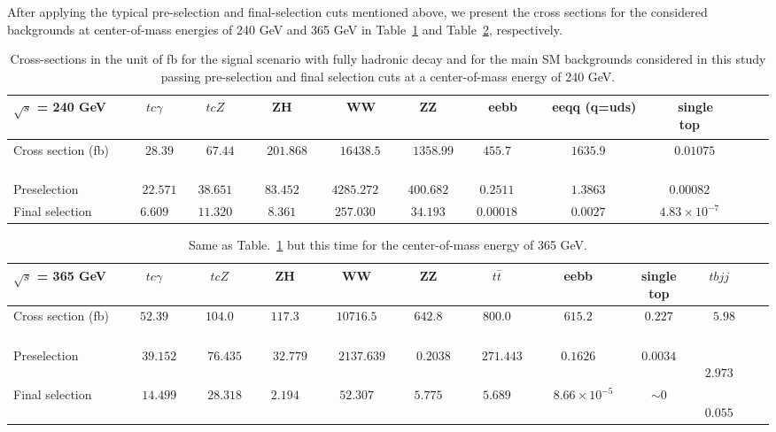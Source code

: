 \documentclass[11pt,onecolumn,english,showpacs,preprintnumbers,amsmath,amssymb,floatfix,nofootinbib]{revtex4-1}
\begin{document}
After applying the typical pre-selection and final-selection cuts mentioned above, we present the cross sections for the considered backgrounds at center-of-mass energies of 240 GeV and 365 GeV in Table~\ref{bkg-240-full-hadronic} and Table~\ref{bkg-365-full-hadronic}, respectively.
\begin{table}[htbp]
\begin{center}
\begin{tabular}{l|c c c c c c  c c c c c  }  \hline
$\sqrt {s}$ = 240 GeV   ~&~ $tc\gamma$  ~&~ $tcZ$   ~&  ~  ZH     ~&  ~ WW  &  ~  ZZ ~ &~ eebb ~&~ eeqq (q=uds) ~&~ single top  \\  \hline
Cross section (fb)    ~&~  $28.39$  ~&~ $67.44$  ~&~    $201.868$        ~&~  $16438.5$   ~&~    $1358.99$  ~&~  $455.7$ ~&~  $1635.9$  ~&~  $0.01075$       \\ 
Preselection    ~&~  $22.571$  & $38.651$  &    $83.452$        &  $4285.272$   &    $400.682$  &  $0.2511$ &  $1.3863$  &  $0.00082$        \\ 
Final selection
  &  $6.609$  & $11.320$  &    $8.361$        &  $257.030$   &    $34.193$  &  $0.00018$ &  $0.0027$  &  $4.83\times10^{-7}$       \\   \hline  \hline
\end{tabular}
\end{center}
\caption{Cross-sections in the unit of fb for the signal scenario with fully hadronic decay  
and for the main SM backgrounds considered in this study 
passing pre-selection and final selection cuts at a center-of-mass energy of 240 GeV.}
\label{bkg-240-full-hadronic}
\end{table}


\begin{table}[htbp]
\begin{center}
\begin{tabular}{l|c c c c  c c  c c c c c  }  \hline
$\sqrt {s}$ = 365 GeV      & $tc\gamma$  & $tcZ$   & ZH   &  WW  & ZZ & $t \bar{t}$ & eebb & single top & $tbjj$  \\  \hline
Cross section (fb)    ~&~  $52.39$  ~&~  $104.0$    ~&~  $117.3$ ~&~    $10716.5$     ~&~  $642.8$  ~&~ $800.0$        ~&~  $615.2$  ~&~  $0.227$  ~&~ $5.98$       \\ 
Preselection    ~&~  $39.152$  ~&~  $76.435$    ~&~  $32.779$ ~&~  $2137.639$     ~&~  $0.2038$  ~&~ $271.443$    ~&~  $0.1626$  ~&~  $0.0034$  ~&~ $2.973$       \\ 
Final selection    ~&~  $14.499$  ~&~  $28.318$    ~&~  $2.194$ ~&~ $52.307$  ~&~  $5.775$  ~&~ $5.689$  ~&~  $8.66 \times 10^{-5}$  ~&~ $\sim 0$  ~&~ $0.055$       \\  \hline  \hline
\end{tabular}
\end{center}
\caption{Same as Table.~\ref{bkg-240-full-hadronic} but this time for the center-of-mass energy of 365 GeV.}
\label{bkg-365-full-hadronic}
\end{table}
\end{document}
